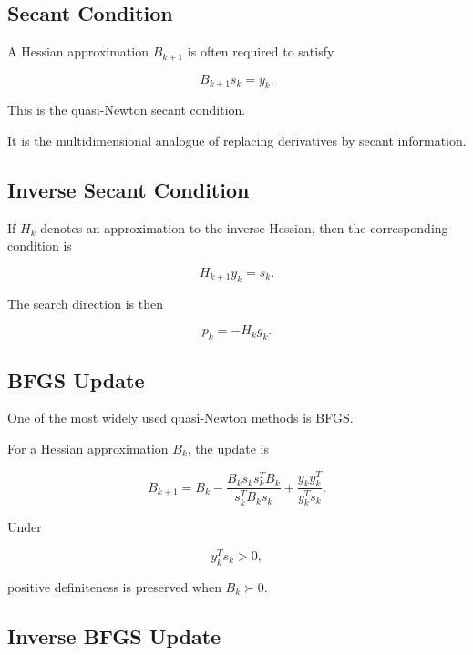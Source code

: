 \subsection{Secant Condition}
\label{subsec:quasi-newton-secant-condition}

A Hessian approximation \(B_{k+1}\) is often required to satisfy

\[
\boxed{
B_{k+1}s_k
=
y_k.
}
\]

This is the quasi-Newton secant condition.

It is the multidimensional analogue of replacing derivatives by secant
information.

\subsection{Inverse Secant Condition}
\label{subsec:inverse-secant-condition}

If \(H_k\) denotes an approximation to the inverse Hessian, then the
corresponding condition is

\[
\boxed{
H_{k+1}y_k
=
s_k.
}
\]

The search direction is then

\[
\boxed{
p_k
=
-H_kg_k.
}
\]

\subsection{BFGS Update}
\label{subsec:bfgs-update}

One of the most widely used quasi-Newton methods is BFGS.

For a Hessian approximation \(B_k\), the update is

\[
\boxed{
B_{k+1}
=
B_k
-
\frac{
B_ks_ks_k^TB_k
}{
s_k^TB_ks_k
}
+
\frac{
y_ky_k^T
}{
y_k^Ts_k
}.
}
\]

Under

\[
\boxed{
y_k^Ts_k>0,
}
\]

positive definiteness is preserved when \(B_k\succ0\).

\subsection{Inverse BFGS Update}
\label{subsec:inverse-bfgs-update}

